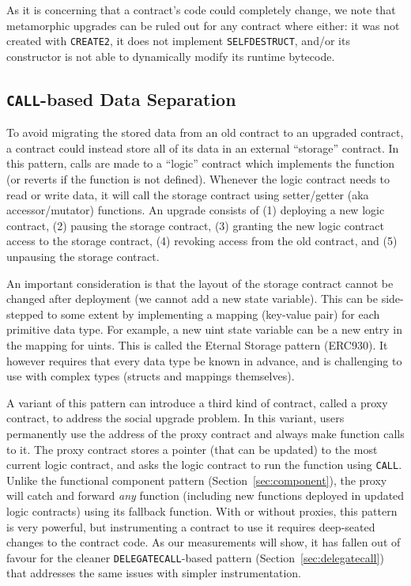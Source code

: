 As it is concerning that a contract's code could completely change, we note that metamorphic upgrades can be ruled out for any contract where either: it was not created with \texttt{CREATE2}, it does not implement \texttt{SELFDESTRUCT}, and/or its constructor is not able to dynamically modify its runtime bytecode. 


\subsection{\texttt{CALL}-based Data Separation}
\label{sec:callbased}

To avoid migrating the stored data from an old contract to an upgraded contract, a contract could instead store all of its data in an external ``storage'' contract. In this pattern, calls are made to a ``logic'' contract which implements the function (or reverts if the function is not defined). Whenever the logic contract needs to read or write data, it will call the storage contract using setter/getter (aka accessor/mutator) functions. An upgrade consists of (1) deploying a new logic contract, (2) pausing the storage contract, (3) granting the new logic contract access to the storage contract, (4) revoking access from the old contract, and (5) unpausing the storage contract. 

An important consideration is that the layout of the storage contract cannot be changed after deployment (\eg we cannot add a new state variable). This can be side-stepped to some extent by implementing a mapping (key-value pair) for each primitive data type. For example, a new uint state variable can be a new entry in the mapping for uints. This is called the Eternal Storage pattern (ERC930). It however requires that every data type be known in advance, and is challenging to use with complex types (\eg structs and mappings themselves).

A variant of this pattern can introduce a third kind of contract, called a proxy contract, to address the social upgrade problem. In this variant, users permanently use the address of the proxy contract and always make function calls to it. The proxy contract stores a pointer (that can be updated) to the most current logic contract, and asks the logic contract to run the function using \texttt{CALL}. Unlike the functional component pattern (Section~\ref{sec:component}), the proxy will catch and forward \textit{any} function (including new functions deployed in updated logic contracts) using its fallback function.  With or without proxies, this pattern is very powerful, but instrumenting a contract to use it requires deep-seated changes to the contract code. As our measurements will show, it has fallen out of favour for the cleaner \texttt{DELEGATECALL}-based pattern (Section~\ref{sec:delegatecall}) that addresses the same issues with simpler instrumentation. 


